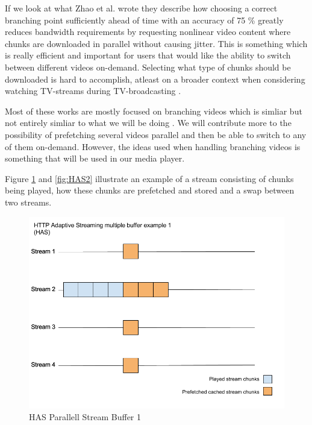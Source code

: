 If we look at what Zhao et al. \cite{scalableOnDemand} wrote they describe how choosing a correct branching point sufficiently ahead of time with an accuracy of 75 \% greatly reduces bandwidth requirements by requesting nonlinear video content where chunks are downloaded in parallel without causing jitter. This is something which is really efficient and important for users that would like the ability to switch between different videos on-demand. Selecting what type of chunks should be downloaded is hard to accomplish, atleast on a broader context when considering watching TV-streams during TV-broadcasting \cite{scalableOnDemand}. 

Most of these works are mostly focused on branching videos which is simliar but not entirely simliar to what we will be doing \cite{qualbranch, hasmultipath,scalableOnDemand}. We will contribute more to the possibility of prefetching several videos parallel and then be able to switch to any of  them on-demand. However, the ideas used when handling branching videos is something that will be used in our media player.

Figure \ref{fig:HAS1} and \ref{fig:HAS2} illustrate an example of a stream consisting of chunks being played, how these chunks are prefetched and stored and a swap between two streams.

\begin{figure}[!ht]
\begin{center}
\includegraphics[scale=0.4]{HAS1.png}
\caption{HAS Parallell Stream Buffer 1}
\label{fig:HAS1}
\end{center}
\end{figure}

